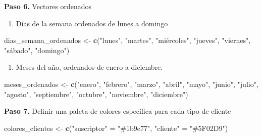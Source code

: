 \documentclass[
]{article}
\newenvironment{Shaded}{\begin{snugshade}}{\end{snugshade}}
\newcommand{\FunctionTok}[1]{\textcolor[rgb]{0.13,0.29,0.53}{\textbf{#1}}}
\newcommand{\NormalTok}[1]{#1}
\newcommand{\OtherTok}[1]{\textcolor[rgb]{0.56,0.35,0.01}{#1}}
\newcommand{\StringTok}[1]{\textcolor[rgb]{0.31,0.60,0.02}{#1}}
\providecommand{\tightlist}{%
  \setlength{\itemsep}{0pt}\setlength{\parskip}{0pt}}
\begin{document}
\hfill\break
\textbf{Paso 6.} Vectores ordenados

\begin{enumerate}
\def\labelenumi{\arabic{enumi}.}
\tightlist
\item
  Días de la semana ordenados de lunes a domingo
\end{enumerate}

\begin{Shaded}
\begin{Highlighting}[]
\NormalTok{  dias\_semana\_ordenados }\OtherTok{\textless{}{-}} \FunctionTok{c}\NormalTok{(}\StringTok{"lunes"}\NormalTok{, }\StringTok{"martes"}\NormalTok{, }\StringTok{"miércoles"}\NormalTok{, }\StringTok{"jueves"}\NormalTok{, }\StringTok{"viernes"}\NormalTok{, }\StringTok{"sábado"}\NormalTok{, }\StringTok{"domingo"}\NormalTok{)}
\end{Highlighting}
\end{Shaded}

\begin{enumerate}
\def\labelenumi{\arabic{enumi}.}
\setcounter{enumi}{1}
\tightlist
\item
  Meses del año, ordenados de enero a diciembre.
\end{enumerate}

\begin{Shaded}
\begin{Highlighting}[]
\NormalTok{  meses\_ordenados }\OtherTok{\textless{}{-}} \FunctionTok{c}\NormalTok{(}\StringTok{"enero"}\NormalTok{, }\StringTok{"febrero"}\NormalTok{, }\StringTok{"marzo"}\NormalTok{, }\StringTok{"abril"}\NormalTok{, }\StringTok{"mayo"}\NormalTok{, }\StringTok{"junio"}\NormalTok{, }
                         \StringTok{"julio"}\NormalTok{, }\StringTok{"agosto"}\NormalTok{, }\StringTok{"septiembre"}\NormalTok{, }\StringTok{"octubre"}\NormalTok{, }\StringTok{"noviembre"}\NormalTok{, }\StringTok{"diciembre"}\NormalTok{)}
\end{Highlighting}
\end{Shaded}

\hfill\break
\hfill\break
\textbf{Paso 7.} Definir una paleta de colores específica para cada tipo
de cliente

\begin{Shaded}
\begin{Highlighting}[]
\NormalTok{colores\_clientes }\OtherTok{\textless{}{-}} \FunctionTok{c}\NormalTok{(}\StringTok{"suscriptor"} \OtherTok{=} \StringTok{"\#1b9e77"}\NormalTok{, }\StringTok{"cliente"} \OtherTok{=} \StringTok{"\#5F02D9"}\NormalTok{)}
\end{Highlighting}
\end{Shaded}
\end{document}

